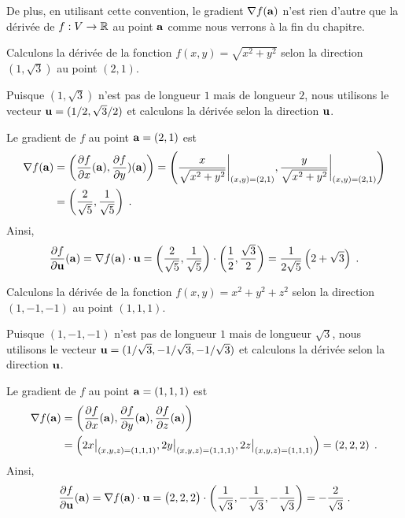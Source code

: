{\begin{rmk}
De plus, en utilisant cette convention, le gradient
$\nabla f(\mathbf{a})$ n'est rien d'autre que la dérivée de $f:V\to \mathbb{R}$
au point $\mathbf{a}$ comme nous verrons à la fin du chapitre.
\end{rmk}

\begin{egg}
Calculons la dérivée de la fonction $f(x,y) = \sqrt{x^2+y^2}$ selon la
direction $(1,\sqrt{3})$ au point $(2,1)$.

Puisque $(1,\sqrt{3})$ n'est pas de longueur $1$ mais de longueur $2$,
nous utilisons le vecteur $\mathbf{u} = (1/2 , \sqrt{3}/2)$ et calculons la
dérivée selon la direction $\mathbf{u}$.

Le gradient de $f$ au point $\mathbf{a}=(2,1)$ est
\begin{align*}
\nabla f(\mathbf{a}) &= \left( \frac{\partial f}{\partial x}(\mathbf{a}),
\frac{\partial f}{\partial y})(\mathbf{a}) \right)
= \left( \frac{x}{\sqrt{x^2+y^2}}\bigg|_{(x,y)=(2,1)} ,
\frac{y}{\sqrt{x^2+y^2}}\bigg|_{(x,y)=(2,1)} \right) \\
&= \left( \frac{2}{\sqrt{5}}, \frac{1}{\sqrt{5}} \right) \; .
\end{align*}
Ainsi,
\[
\frac{\partial f}{\partial \mathbf{u}}(\mathbf{a}) = \nabla f(\mathbf{a})\cdot \mathbf{u}
= \left( \frac{2}{\sqrt{5}}, \frac{1}{\sqrt{5}} \right)
\cdot \left(\frac{1}{2} , \frac{\sqrt{3}}{2}\right)
= \frac{1}{2\sqrt{5}}\left(2+\sqrt{3}\right)\; .
\]
\end{egg}

\begin{egg}
Calculons la dérivée de la fonction $f(x,y) = x^2+y^2+z^2$ selon la
direction $(1,-1,-1)$ au point $(1,1,1)$.

Puisque $(1,-1,-1)$ n'est pas de longueur $1$ mais de longueur $\sqrt{3}$,
nous utilisons le vecteur
$\mathbf{u} = (1/\sqrt{3} , -1/\sqrt{3},-1/\sqrt{3})$
et calculons la dérivée selon la direction $\mathbf{u}$.

Le gradient de $f$ au point $\mathbf{a}=(1,1,1)$ est
\begin{align*}
\nabla f(\mathbf{a}) &= \left( \frac{\partial f}{\partial x}(\mathbf{a}),
\frac{\partial f}{\partial y}(\mathbf{a}), \frac{\partial f}{\partial z}(\mathbf{a}) \right) \\
& = \left( 2x\big|_{(x,y,z)=(1,1,1)} , 2y\big|_{(x,y,z)=(1,1,1)} ,
2z\big|_{(x,y,z)=(1,1,1)} \right)
= \left( 2, 2, 2 \right) \; .
\end{align*}
Ainsi,
\[
\frac{\partial f}{\partial \mathbf{u}}(\mathbf{a}) = \nabla f(\mathbf{a})\cdot \mathbf{u}
= \big(2,2,2\big)\cdot \left(\frac{1}{\sqrt{3}} , -\frac{1}{\sqrt{3}}, 
-\frac{1}{\sqrt{3}} \right)
= -\frac{2}{\sqrt{3}} \; .
\]
\end{egg}

}
